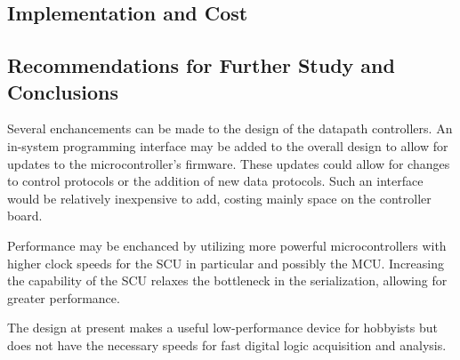\subsection{Implementation and Cost}

\subsection{Recommendations for Further Study and Conclusions}
Several enchancements can be made to the design of the datapath controllers.
An in-system programming interface may be added to the overall design to allow
for updates to the microcontroller's firmware. These updates could allow for 
changes to control protocols or the addition of new data protocols. Such an 
interface would be relatively inexpensive to add, costing mainly space on the 
controller board.

Performance may be enchanced by utilizing more powerful microcontrollers with
higher clock speeds for the SCU in particular and possibly the MCU. Increasing 
the capability of the SCU relaxes the bottleneck in the serialization, allowing for greater performance.

The design at present makes a useful low-performance device for hobbyists but 
does not have the necessary speeds for fast digital logic acquisition and 
analysis.
